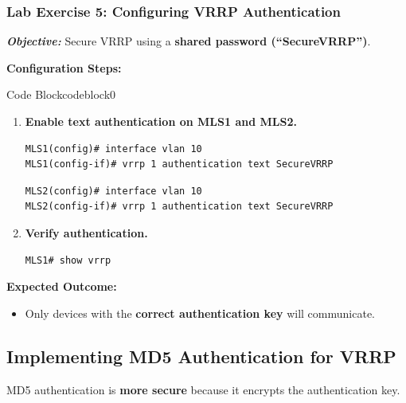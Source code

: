 \documentclass[a4paper]{book}
\begin{document}
\subsubsection{Lab Exercise 5: Configuring VRRP Authentication}
\textbf{\textit{Objective:}} Secure VRRP using a \textbf{shared password (``SecureVRRP'')}.
\vspace{1.5em}

\textbf{Configuration Steps:}

\vspace{1.5em}


\begin{ocg}{Code Block}{codeblock}{0}

\vspace{0.5cm}
\begin{enumerate}
\item \textbf{Enable text authentication on MLS1 and MLS2.}
\begin{lstlisting}
MLS1(config)# interface vlan 10
MLS1(config-if)# vrrp 1 authentication text SecureVRRP
\end{lstlisting}
\begin{lstlisting}
MLS2(config)# interface vlan 10
MLS2(config-if)# vrrp 1 authentication text SecureVRRP
\end{lstlisting}

\item \textbf{Verify authentication.}
\begin{lstlisting}
MLS1# show vrrp
\end{lstlisting}
\end{enumerate}
\end{ocg}




\textbf{Expected Outcome:}
\begin{itemize}
\item Only devices with the \textbf{correct authentication key} will communicate.
\end{itemize}

\subsection{Implementing MD5 Authentication for VRRP}
MD5 authentication is \textbf{more secure} because it encrypts the authentication key.
\end{document}
